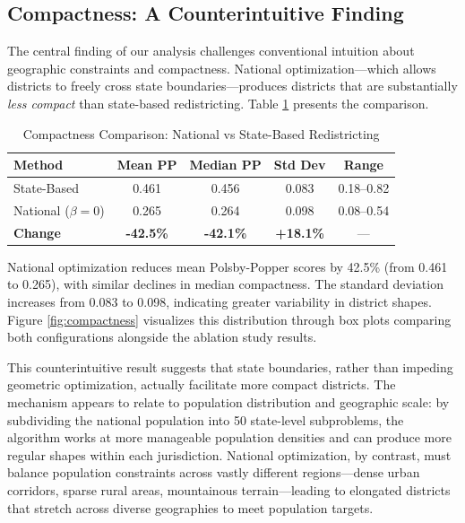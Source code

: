 
\subsection{Compactness: A Counterintuitive Finding}

The central finding of our analysis challenges conventional intuition about geographic constraints and compactness. National optimization---which allows districts to freely cross state boundaries---produces districts that are substantially \textit{less compact} than state-based redistricting. Table \ref{tab:compactness} presents the comparison.

\begin{table}[h]
\centering
\caption{Compactness Comparison: National vs State-Based Redistricting}
\label{tab:compactness}
\begin{tabular}{lcccc}
\toprule
\textbf{Method} & \textbf{Mean PP} & \textbf{Median PP} & \textbf{Std Dev} & \textbf{Range} \\
\midrule
State-Based & 0.461 & 0.456 & 0.083 & 0.18--0.82 \\
National ($ \beta = 0 $) & 0.265 & 0.264 & 0.098 & 0.08--0.54 \\
\midrule
\textbf{Change} & \textbf{-42.5\%} & \textbf{-42.1\%} & \textbf{+18.1\%} & --- \\
\bottomrule
\end{tabular}
\end{table}

National optimization reduces mean Polsby-Popper scores by 42.5\% (from 0.461 to 0.265), with similar declines in median compactness. The standard deviation increases from 0.083 to 0.098, indicating greater variability in district shapes. Figure \ref{fig:compactness} visualizes this distribution through box plots comparing both configurations alongside the ablation study results.

This counterintuitive result suggests that state boundaries, rather than impeding geometric optimization, actually facilitate more compact districts. The mechanism appears to relate to population distribution and geographic scale: by subdividing the national population into 50 state-level subproblems, the algorithm works at more manageable population densities and can produce more regular shapes within each jurisdiction. National optimization, by contrast, must balance population constraints across vastly different regions---dense urban corridors, sparse rural areas, mountainous terrain---leading to elongated districts that stretch across diverse geographies to meet population targets.

